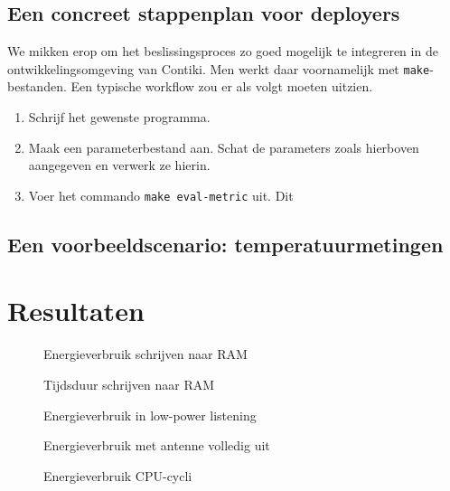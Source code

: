 \documentclass{article}
\begin{document}
\subsection{Een concreet stappenplan voor deployers}
We mikken erop om het beslissingsproces zo goed mogelijk te integreren in
de ontwikkelingsomgeving van Contiki. Men werkt daar voornamelijk met
\texttt{make}-bestanden. Een typische workflow zou er als volgt moeten uitzien.

\begin{enumerate}
\item Schrijf het gewenste programma.
\item Maak een parameterbestand aan. Schat de parameters zoals hierboven
aangegeven en verwerk ze hierin.
\item Voer het commando \texttt{make eval-metric} uit. Dit 
\end{enumerate}

\subsection{Een voorbeeldscenario: temperatuurmetingen}

\section{Resultaten}

\begin{figure}[h]
\centering
\missingfigure{}
\caption{Energieverbruik schrijven naar RAM}
\label{fig:energieverbruik_ram}
\end{figure}

\begin{figure}[h]
\centering
\missingfigure{}
\caption{Tijdsduur schrijven naar RAM}
\label{fig:tijdsduur_ram}
\end{figure}

\begin{figure}[h]
\centering
\missingfigure{}
\caption{Energieverbruik in low-power listening}
\label{fig:energieverbruik_low_power}
\end{figure}

\begin{figure}[h]
\centering
\missingfigure{}
\caption{Energieverbruik met antenne volledig uit}
\label{fig:energieverbruik_antenne_uit}
\end{figure}

\begin{figure}[h]
\centering
\missingfigure{}
\caption{Energieverbruik CPU-cycli}
\label{fig:energieverbruik_cpu}
\end{figure}
\end{document}
